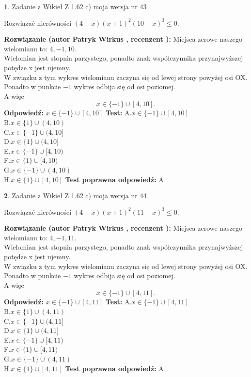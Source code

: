 \documentclass[12pt, a4paper]{article}
\theoremstyle{definition} %
\newtheorem{zad}{}
\newcommand{\zadStart}[1]{\begin{zad}#1\newline}
\newcommand{\zadStop}{\end{zad}}
\newcommand{\rozwStart}[2]{\noindent \textbf{Rozwiązanie (autor #1 , recenzent #2): }\newline}
\newcommand{\rozwStop}{\newline}
\newcommand{\odpStart}{\noindent \textbf{Odpowiedź:}\newline}
\newcommand{\odpStop}{\newline}
\newcommand{\testStart}{\noindent \textbf{Test:}\newline}
\newcommand{\testStop}{\newline}
\newcommand{\kluczStart}{\noindent \textbf{Test poprawna odpowiedź:}\newline}
\newcommand{\kluczStop}{\newline}
\begin{document}
\zadStart{Zadanie z Wikieł Z 1.62 c) moja wersja nr 43}

Rozwiązać nierówności $(4-x)(x+1)^{2}(10-x)^{3}\le0$.
\zadStop
\rozwStart{Patryk Wirkus}{}
Miejsca zerowe naszego wielomianu to: $4, -1, 10$.\\
Wielomian jest stopnia parzystego, ponadto znak współczynnika przy\linebreak najwyższej potędze x jest ujemny.\\ W związku z tym wykres wielomianu zaczyna się od lewej strony powyżej osi OX.\\
Ponadto w punkcie $-1$ wykres odbija się od osi poziomej.\\
A więc $$x \in \{-1\} \cup [4,10].$$
\rozwStop
\odpStart
$x \in \{-1\} \cup [4,10]$
\odpStop
\testStart
A.$x \in \{-1\} \cup [4,10]$\\
B.$x \in \{1\} \cup (4,10)$\\
C.$x \in \{-1\} \cup (4,10]$\\
D.$x \in \{1\} \cup (4,10]$\\
E.$x \in \{-1\} \cup [4,10)$\\
F.$x \in \{1\} \cup [4,10)$\\
G.$x \in \{-1\} \cup (4,10)$\\
H.$x \in \{1\} \cup [4,10]$
\testStop
\kluczStart
A
\kluczStop



\zadStart{Zadanie z Wikieł Z 1.62 c) moja wersja nr 44}

Rozwiązać nierówności $(4-x)(x+1)^{2}(11-x)^{3}\le0$.
\zadStop
\rozwStart{Patryk Wirkus}{}
Miejsca zerowe naszego wielomianu to: $4, -1, 11$.\\
Wielomian jest stopnia parzystego, ponadto znak współczynnika przy\linebreak najwyższej potędze x jest ujemny.\\ W związku z tym wykres wielomianu zaczyna się od lewej strony powyżej osi OX.\\
Ponadto w punkcie $-1$ wykres odbija się od osi poziomej.\\
A więc $$x \in \{-1\} \cup [4,11].$$
\rozwStop
\odpStart
$x \in \{-1\} \cup [4,11]$
\odpStop
\testStart
A.$x \in \{-1\} \cup [4,11]$\\
B.$x \in \{1\} \cup (4,11)$\\
C.$x \in \{-1\} \cup (4,11]$\\
D.$x \in \{1\} \cup (4,11]$\\
E.$x \in \{-1\} \cup [4,11)$\\
F.$x \in \{1\} \cup [4,11)$\\
G.$x \in \{-1\} \cup (4,11)$\\
H.$x \in \{1\} \cup [4,11]$
\testStop
\kluczStart
A
\kluczStop
\end{document}
